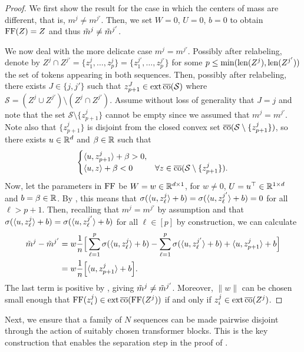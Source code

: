\documentclass[11pt,a4paper]{amsart}
\begin{document}
\begin{proof}
We first show the result for the case in which the centers of mass are different, that is, $m^j \neq m^{j'}$. Then, we set $W = 0$, $U=0$, $b=0$ to obtain $\operatorname{\mathrm{FF}}(Z) = Z$ and thus $\Tilde{m}^j \neq \Tilde{m}^{j'}$.

We now deal with the more delicate case $m^j = m^{j'}$. Possibly after relabeling, denote by $Z^j \cap Z^{j'} = \{ z_1^j, \dots, z_p^j\} = \{ z_1^{j'}, \dots, z_p^{j'}\}$ for some $p \leq \min (\operatorname{len} (Z^j), \operatorname{len} (Z^{j'}))$ the set of tokens appearing in both sequences. Then, possibly after relabeling, there exists $J \in \{ j, j'\}$ such that $z_{p+1}^J \in \operatorname{ext} \operatorname{\overline{co}} (\mathcal{S})$ where $\mathcal{S} = (Z^j \cup Z^{j'}) \setminus (Z^j \cap Z^{j'})$. Assume without loss of generality that $J = j$ and note that the set $\mathcal{S} \setminus \{ z_{p+1}^j\}$ cannot be empty since we assumed that $m^j = m^{j'}$. Note also that $\{ z_{p+1}^j \}$ is disjoint from the closed convex set $\operatorname{\overline{co}}(\mathcal{S} \setminus \{ z_{p+1}^j\})$, so there exists $u\in \mathbb{R}^d$ and $\beta \in \mathbb{R}$ such that
\begin{equation}\label{e:hyperplane}
\begin{cases} 
    \langle u, z_{p+1}^j \rangle + \beta > 0, \\ 
    \langle u, z \rangle + \beta < 0  &\forall z\in \operatorname{\overline{co}} (\mathcal{S}\setminus \{ z_{p+1}^j \}).  
\end{cases}
\end{equation}
Now, let the parameters in $\operatorname{\mathrm{FF}}$ be $W = w \in \mathbb{R}^{d\times 1}$, for $w \neq 0$, $U = u^\top \in \mathbb{R}^{1 \times d}$ and $b = \beta \in \mathbb{R}$. By , this means that $\sigma (\langle u, z_\ell^{j} \rangle + b) = \sigma (\langle u, z_\ell^{j'} \rangle + b) = 0$ for all $\ell > p+1$. Then, recalling that $m^j = m^{j'}$ by assumption and that $\sigma(\langle u, z_\ell^j \rangle + b) = \sigma(\langle u, z_\ell^{j'} \rangle + b)$ for all $\ell\in [p]$ by construction, we can calculate
\begin{equation}
\begin{aligned}
    \Tilde{m}^j - \Tilde{m}^{j'} &= w\frac{1}{n} \Big[ \sum_{\ell = 1}^p \sigma(\langle u, z_\ell^j \rangle + b) - \sum_{\ell = 1}^p \sigma(\langle u, z_\ell^{j'} \rangle + b)
    + \langle u, z_{p+1}^j \rangle + b \Big] \\
    &= w\frac{1}{n} \Big[\langle u, z_{p+1}^j \rangle + b\Big].
\end{aligned}
\end{equation}
The last term is positive by , giving $\Tilde{m}^j \neq \Tilde{m}^{j'}$. Moreover, $\|w \|$ can be chosen small enough that $\operatorname{\mathrm{FF}}(z_i^j) \in \operatorname{ext}\operatorname{\overline{co}}(\operatorname{\mathrm{FF}}(Z^j))$ if and only if $z_i^j \in \operatorname{ext} \operatorname{\overline{co}} (Z^j)$.
\end{proof}
Next, we ensure that a family of $N$ sequences can be made pairwise disjoint through the action of suitably chosen transformer blocks. This is the key construction that enables the separation step in the proof of .
\end{document}
